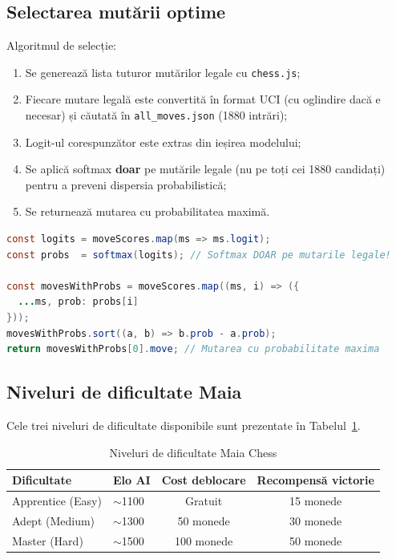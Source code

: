 \documentclass[12pt, a4paper, twoside]{report}
\numberwithin{equation}{section}
\begin{document}
\subsection{Selectarea mutării optime}

Algoritmul de selecție:
\begin{enumerate}
  \item Se generează lista tuturor mutărilor legale cu \texttt{chess.js};
  \item Fiecare mutare legală este convertită în format UCI (cu oglindire dacă e
    necesar) și căutată în \texttt{all\_moves.json} (1880 intrări);
  \item Logit-ul corespunzător este extras din ieșirea modelului;
  \item Se aplică softmax \textbf{doar} pe mutările legale (nu pe toți cei 1880
    candidați) pentru a preveni dispersia probabilistică;
  \item Se returnează mutarea cu probabilitatea maximă.
\end{enumerate}

\begin{lstlisting}[language=Java, caption={Selecția mutării optime Maia}]
const logits = moveScores.map(ms => ms.logit);
const probs  = softmax(logits); // Softmax DOAR pe mutarile legale!

const movesWithProbs = moveScores.map((ms, i) => ({
  ...ms, prob: probs[i]
}));
movesWithProbs.sort((a, b) => b.prob - a.prob);
return movesWithProbs[0].move; // Mutarea cu probabilitate maxima
\end{lstlisting}

\subsection{Niveluri de dificultate Maia}

Cele trei niveluri de dificultate disponibile sunt prezentate în Tabelul~\ref{tab:maia_diff}.

\begin{table}[H]
\centering
\caption{Niveluri de dificultate Maia Chess}
\label{tab:maia_diff}
\begin{tabular}{llcc}
\toprule
\textbf{Dificultate} & \textbf{Elo AI} & \textbf{Cost deblocare} & \textbf{Recompensă victorie} \\
\midrule
Apprentice (Easy) & $\sim$1100 & Gratuit & 15 monede \\
Adept (Medium) & $\sim$1300 & 50 monede & 30 monede \\
Master (Hard) & $\sim$1500 & 100 monede & 50 monede \\
\bottomrule
\end{tabular}
\end{table}
\end{document}
